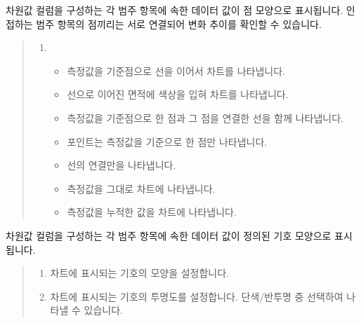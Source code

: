 \documentclass[letterpaper,10pt,english]{sphinxmanual}
\begin{document}
차원값 컬럼을 구성하는 각 범주 항목에 속한 데이터 값이 점 모양으로 표시됩니다. 인접하는 범주 항목의 점끼리는 서로 연결되어 변화 추이를 확인할 수 있습니다.
\begin{quote}

\begin{figure}[H]
\centering

\noindent{}
\end{figure}
\begin{enumerate}
\def\theenumi{\arabic{enumi}}
\def\labelenumi{\theenumi .}
\makeatletter\def\p@enumii{\p@enumi \theenumi .}\makeatother
\item {} 
\begin{itemize}
\item {} 
 측정값을 기준점으로 선을 이어서 차트를 나타냅니다.

\item {} 
 선으로 이어진 면적에 색상을 입혀 차트를 나타냅니다.

\item {} 
 측정값을 기준점으로 한 점과 그 점을 연결한 선을 함께 나타냅니다.

\item {} 
 포인트는 측정값을 기준으로 한 점만 나타냅니다.

\item {} 
 선의 연결만을 나타냅니다.

\item {} 
 측정값을 그대로 차트에 나타냅니다.

\item {} 
 측정값을 누적한 값을 차트에 나타냅니다.

\end{itemize}

\end{enumerate}
\end{quote}


차원값 컬럼을 구성하는 각 범주 항목에 속한 데이터 값이 정의된 기호 모양으로 표시됩니다.
\begin{quote}

\begin{figure}[H]
\centering

\noindent{}
\end{figure}
\begin{enumerate}
\def\theenumi{\arabic{enumi}}
\def\labelenumi{\theenumi .}
\makeatletter\def\p@enumii{\p@enumi \theenumi .}\makeatother
\item {} 
 차트에 표시되는 기호의 모양을 설정합니다.

\item {} 
 차트에 표시되는 기호의 투명도를 설정합니다. 단색/반투명 중 선택하여 나타낼 수 있습니다.

\end{enumerate}
\end{quote}
\end{document}
